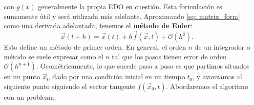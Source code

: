   con $g(x)$ generalmente la propia EDO en cuestión. Esta formulación es sumamente útil y será utilizada más adelante. Aproximando \eqref{eq: matrix_form} como una derivada adelantada, tenemos el \textbf{método de Euler}:
  \begin{equation}
    \vec{x}(t+h) = \vec{x}(t) + h\vec{f}(\vec{x},t) + \mathcal{O}(h^2).
\end{equation}
Esto define un método de primer orden. En general, el orden  $n$ de un integrador o método se suele expresar como el $n$ tal que los pasos tienen error de orden $\mathcal{O}(h^{n+1})$. Geométricamente, lo que sucede paso a paso es que partimos situados en un punto $\vec{x}_0$ dado por una condición inicial en un tiempo $t_0$, y avanzamos al siguiente punto siguiendo el vector tangente $f(\vec{x}_0,t)$. Abordaremos el algoritmo con un problema.

